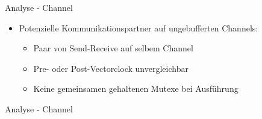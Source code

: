 \documentclass[aspectratio=169]{beamer}  %
\begin{document}
\begin{frame}{Analyse - Channel}
  \begin{itemize}
    \item Potenzielle Kommunikationspartner auf ungebufferten Channels:
    \begin{itemize}
      \item Paar von Send-Receive auf selbem Channel
      \item Pre- oder Post-Vectorclock unvergleichbar
      \item Keine gemeinsamen gehaltenen Mutexe bei Ausführung
    \end{itemize}
  \end{itemize}
\end{frame}

\begin{frame}{Analyse - Channel}
  
\end{frame}
\end{document}
